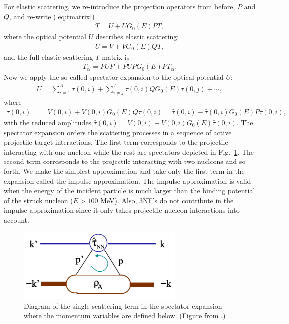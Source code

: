 \documentclass[preprintnumbers,floatfix,aps,prc,preprint,nofootinbib]{revtex4-1}
\begin{document}
For elastic scattering, we re-introduce the projection operators from before, $P$ and $Q$, and re-write (\ref{eq:tmatrix})
%
\begin{eqnarray}
	\label{eq:tmatrix_elastic}
	T = U + U G_0(E) P T,
\end{eqnarray}
%
where the optical potential $U$ describes elastic scattering:
%
\begin{eqnarray}
	\label{eq:ms_optical_potential_elastic}
	U = V + V G_0(E) Q T,
\end{eqnarray}
%
and the full elastic-scattering $T$-matrix is
%
\begin{eqnarray}
	\label{eq:tmatrix_full_elastic}
	T_{el} = P U P + P U P G_0(E) P T_{el}.
\end{eqnarray}
%
Now we apply the so-called spectator expansion to the optical potential $U$:
%
\begin{eqnarray}
	\label{eq:spec_exp}
	U = \sum_{i=1}^A \tau(0, i) + \sum_{i \neq j}^A \tau(0, i) Q G_0(E) \tau(0, j) + \cdots,
\end{eqnarray}
%
where
\begin{eqnarray}
	\label{eq:tau_equations}
	\tau(0, i) &=& V(0, i) + V(0, i) G_0(E) Q \tau(0, i) = \hat{\tau}(0, i) - \hat{\tau}(0, i) G_0(E) P \tau(0, i),
\end{eqnarray}
%
with the reduced amplitudes $\hat{\tau}(0, i) = V(0, i) + V(0, i) G_0(E) \hat{\tau}(0, i)$. The spectator expansion orders the scattering processes in a sequence of active projectile-target interactions. The first term corresponds to the projectile interacting with one nucleon while the rest are spectators depicted in Fig.~\ref{fig:single_scattering}. The second term corresponds to the projectile interacting with two nucleons and so forth. We make the simplest approximation and take only the first term in the expansion called the impulse approximation. The impulse approximation is valid when the energy of the incident particle is much larger than the binding potential of the struck nucleon ($E > 100$ MeV). Also, 3NF's do not contribute in the impulse approximation since it only takes projectile-nucleon interactions into account.

%
\begin{figure}
	\captionsetup{singlelinecheck=false,justification=raggedright}
	\centering
	\includegraphics[width=8cm]{single_scattering}
	\caption{Diagram of the single scattering term in the spectator expansion where the momentum variables are defined below. (Figure from \cite{Burrows:2018ggt}.)}
	\label{fig:single_scattering}
\end{figure}
%
\end{document}
